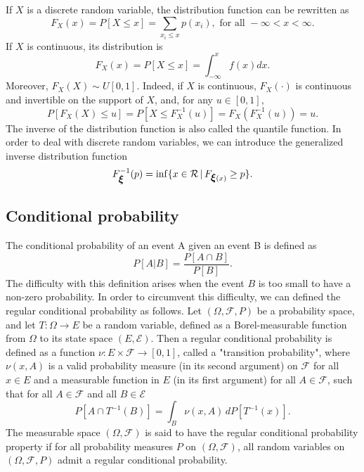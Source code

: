 If $X$ is a discrete random variable, the distribution function can be rewritten as
\[
F_X(x) = P[X \leq x] = \sum_{x_i \leq x} p(x_i), \mbox{ for all } -\infty < x < \infty.
\]
If $X$ is continuous, its distribution is
\[
F_X(x) = P[X \leq x] = \int_{-\infty}^x f(x) dx.
\]
Moreover, $F_X(X) \sim U[0,1]$.
Indeed, if $X$ is continuous, $F_{X}(\cdot)$ is continuous and invertible on the support of $X$, and, for any $u \in [0,1]$,
\[
P[F_X(X) \leq u] = P\left[X \leq F^{-1}_X(u)\right] = F_X\left(F^{-1}_X(u)\right) = u.
\]
The inverse of the distribution function is also called the quantile function.
In order to deal with discrete random variables, we can introduce the generalized inverse distribution function
\[
F_{\mbox{\boldmath $\xi$}}^{-1}(p) = \inf\{x \in \mathcal{R} \,|\, F_{\mbox{\boldmath $\xi$}(x)} \geq p\}.
\]




\subsection{Conditional probability}

The conditional probability of an event A given an event B is defined as
\[
P[A|B]=\frac{P[A\cap B]}{P[B]}.
\]
The difficulty with this definition arises when the event $B$ is too
small to have a non-zero probability.
In order to circumvent this difficulty, we can defined the regular
conditional probability as follows.
Let $(\Omega, \mathcal{F}, P)$ be a probability space, and let
$T:\Omega\rightarrow E$ be a random variable, defined as a
Borel-measurable function from $\Omega$ to its state space $(E,
\mathcal E)$.
Then a regular conditional probability is defined as a function
$\nu:E \times\mathcal{F} \rightarrow [0,1]$, called a "transition
probability", where $\nu(x,A)$ is a valid probability measure (in its
second argument) on $\mathcal{F}$ for all $x\in E$ and a measurable
function in $E$ (in its first argument) for all $A\in\mathcal F$, such
that for all $A\in\mathcal F$ and all $B\in\mathcal E$
\[
P[A\cap T^{-1}(B)] = \int_B \nu(x,A) \,dP[T^{-1}(x)].
\]
The measurable space $(\Omega, \mathcal F)$ is said to have the regular
conditional probability property if for all probability measures
$P$ on $(\Omega, \mathcal F)$, all random variables on $(\Omega,
\mathcal F, P)$ admit a regular conditional probability.


